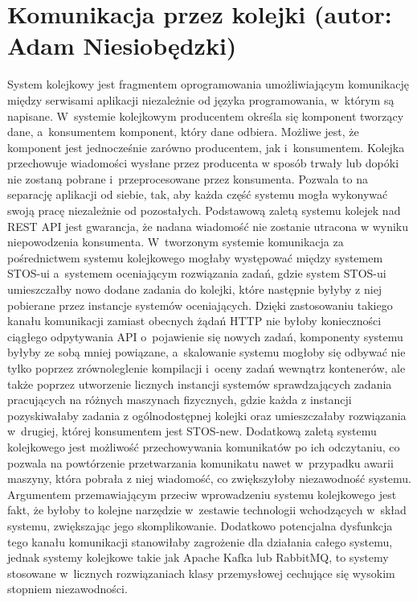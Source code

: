 \section{Komunikacja przez kolejki (autor: Adam Niesiobędzki)}
System kolejkowy jest fragmentem oprogramowania umożliwiającym komunikację między serwisami aplikacji niezależnie od języka programowania, w~którym są napisane. W~systemie kolejkowym producentem określa się komponent tworzący dane, a~konsumentem komponent, który dane odbiera. Możliwe jest, że komponent jest jednocześnie zarówno producentem, jak i~konsumentem. Kolejka przechowuje wiadomości wysłane przez producenta w sposób trwały lub dopóki nie zostaną pobrane i~przeprocesowane przez konsumenta. Pozwala to na separację aplikacji od siebie, tak, aby każda część systemu mogła wykonywać swoją pracę niezależnie od pozostałych. Podstawową zaletą systemu kolejek nad REST API jest gwarancja, że nadana wiadomość nie zostanie utracona w wyniku niepowodzenia konsumenta. W~tworzonym systemie komunikacja za pośrednictwem systemu kolejkowego mogłaby występować między systemem STOS-ui a~systemem oceniającym rozwiązania zadań, gdzie system STOS-ui umieszczałby nowo dodane zadania do kolejki, które następnie byłyby z niej pobierane przez instancje systemów oceniających. Dzięki zastosowaniu takiego kanału komunikacji zamiast obecnych żądań HTTP nie byłoby konieczności ciągłego odpytywania API o~pojawienie się nowych zadań, komponenty systemu byłyby ze sobą mniej powiązane, a~skalowanie systemu mogłoby się odbywać nie tylko poprzez zrównoleglenie kompilacji i~oceny zadań wewnątrz kontenerów, ale także poprzez utworzenie licznych instancji systemów sprawdzających zadania pracujących na różnych maszynach fizycznych, gdzie każda z instancji pozyskiwałaby zadania z ogólnodostępnej kolejki oraz umieszczałaby rozwiązania w~drugiej, której konsumentem jest STOS-new. Dodatkową zaletą systemu kolejkowego jest możliwość przechowywania komunikatów po ich odczytaniu, co pozwala na powtórzenie przetwarzania komunikatu nawet w~przypadku awarii maszyny, która pobrała z niej wiadomość, co zwiększyłoby niezawodność systemu. Argumentem przemawiającym przeciw wprowadzeniu systemu kolejkowego jest fakt, że byłoby to kolejne narzędzie w~zestawie technologii wchodzących w~skład systemu, zwiększając jego skomplikowanie. Dodatkowo potencjalna dysfunkcja tego kanału komunikacji stanowiłaby zagrożenie dla działania całego systemu, jednak systemy kolejkowe takie jak Apache Kafka lub RabbitMQ, to systemy stosowane w~licznych rozwiązaniach klasy przemysłowej cechujące się wysokim stopniem niezawodności.
